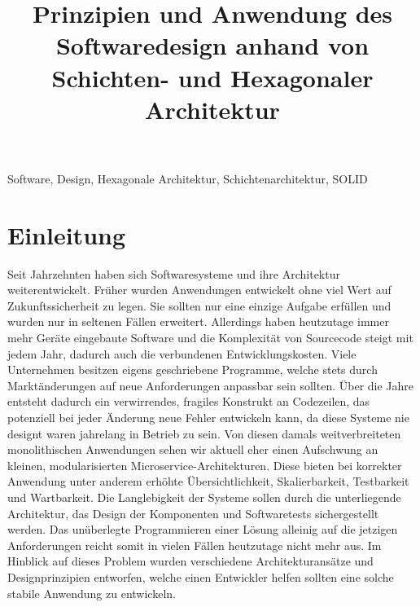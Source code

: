 \documentclass[conference]{IEEEtran}
\begin{document}

\title{Prinzipien und Anwendung des Softwaredesign anhand von Schichten- und Hexagonaler Architektur}

\author{
}

\maketitle


\begin{abstract}
\end{abstract}

\begin{IEEEkeywords}
Software, Design, Hexagonale Architektur, Schichtenarchitektur, SOLID
\end{IEEEkeywords}



\section{Einleitung}


Seit Jahrzehnten haben sich Softwaresysteme und ihre Architektur weiterentwickelt. Früher wurden Anwendungen entwickelt ohne viel Wert auf Zukunftssicherheit zu legen. Sie sollten nur eine einzige Aufgabe erfüllen und wurden nur in seltenen Fällen erweitert. Allerdings haben heutzutage immer mehr Geräte eingebaute Software und die Komplexität von Sourcecode steigt mit jedem Jahr, dadurch auch die verbundenen Entwicklungskosten. Viele Unternehmen besitzen eigens geschriebene Programme, welche stets durch Marktänderungen auf neue Anforderungen anpassbar sein sollten. Über die Jahre entsteht dadurch ein verwirrendes, fragiles Konstrukt an Codezeilen, das potenziell bei jeder Änderung neue Fehler entwickeln kann, da diese Systeme nie designt waren jahrelang in Betrieb zu sein. Von diesen damals weitverbreiteten monolithischen Anwendungen sehen wir aktuell eher einen Aufschwung an kleinen, modularisierten Microservice-Architekturen. Diese bieten bei korrekter Anwendung unter anderem erhöhte Übersichtlichkeit, Skalierbarkeit, Testbarkeit und Wartbarkeit. Die Langlebigkeit der Systeme sollen durch die unterliegende Architektur, das Design der Komponenten und Softwaretests sichergestellt werden. Das unüberlegte Programmieren einer Lösung alleinig auf die jetzigen Anforderungen reicht somit in vielen Fällen heutzutage nicht mehr aus. Im Hinblick auf dieses Problem wurden verschiedene Architekturansätze und Designprinzipien entworfen, welche einen Entwickler helfen sollten eine solche stabile Anwendung zu entwickeln.
\end{document}
